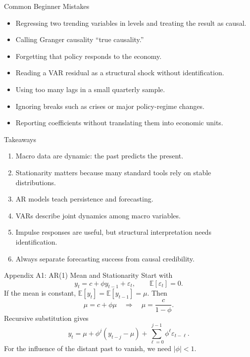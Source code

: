 \documentclass[11pt,aspectratio=169]{beamer}
\newcommand{\E}{\mathbb{E}}
\newcommand{\backbutton}[1]{\vspace{0.4em}\hfill\hyperlink{main:#1}{\beamerbutton{Back to main slide}}}
\begin{document}
\begin{frame}{Common Beginner Mistakes}
  \begin{itemize}
    \item Regressing two trending variables in levels and treating the result as causal.
    \item Calling Granger causality ``true causality.''
    \item Forgetting that policy responds to the economy.
    \item Reading a VAR residual as a structural shock without identification.
    \item Using too many lags in a small quarterly sample.
    \item Ignoring breaks such as crises or major policy-regime changes.
    \item Reporting coefficients without translating them into economic units.
  \end{itemize}
\end{frame}

\begin{frame}{Takeaways}
  \begin{enumerate}
    \item Macro data are dynamic: the past predicts the present.
    \item Stationarity matters because many standard tools rely on stable distributions.
    \item AR models teach persistence and forecasting.
    \item VARs describe joint dynamics among macro variables.
    \item Impulse responses are useful, but structural interpretation needs identification.
    \item Always separate forecasting success from causal credibility.
  \end{enumerate}
\end{frame}

\appendix

\begin{frame}{Appendix A1: AR(1) Mean and Stationarity}
  \hypertarget{app:ar-stationarity}{}
  Start with
  \[
    y_t=c+\phi y_{t-1}+\varepsilon_t,\qquad \E[\varepsilon_t]=0.
  \]
  If the mean is constant, \(\E[y_t]=\E[y_{t-1}]=\mu\). Then
  \[
    \mu=c+\phi\mu
    \quad\Rightarrow\quad
    \mu=\frac{c}{1-\phi}.
  \]
  Recursive substitution gives
  \[
    y_t=\mu+\phi^j(y_{t-j}-\mu)+\sum_{\ell=0}^{j-1}\phi^\ell\varepsilon_{t-\ell}.
  \]
  For the influence of the distant past to vanish, we need \(|\phi|<1\).
  \backbutton{ar1}
\end{frame}
\end{document}
